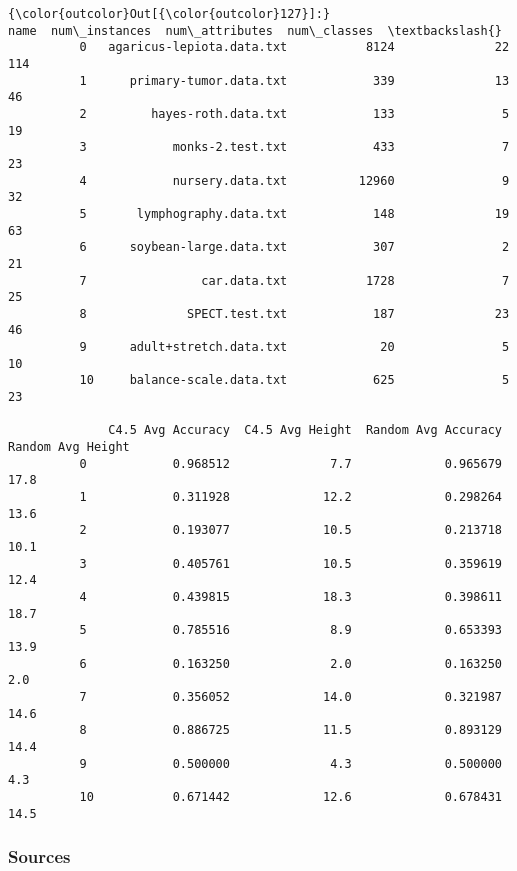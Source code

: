 \documentclass[11pt]{article}
\begin{document}
\begin{Verbatim}[commandchars=\\\{\}]
{\color{outcolor}Out[{\color{outcolor}127}]:}                          name  num\_instances  num\_attributes  num\_classes  \textbackslash{}
          0   agaricus-lepiota.data.txt           8124              22          114   
          1      primary-tumor.data.txt            339              13           46   
          2         hayes-roth.data.txt            133               5           19   
          3            monks-2.test.txt            433               7           23   
          4            nursery.data.txt          12960               9           32   
          5       lymphography.data.txt            148              19           63   
          6      soybean-large.data.txt            307               2           21   
          7                car.data.txt           1728               7           25   
          8              SPECT.test.txt            187              23           46   
          9      adult+stretch.data.txt             20               5           10   
          10     balance-scale.data.txt            625               5           23   
          
              C4.5 Avg Accuracy  C4.5 Avg Height  Random Avg Accuracy  Random Avg Height  
          0            0.968512              7.7             0.965679               17.8  
          1            0.311928             12.2             0.298264               13.6  
          2            0.193077             10.5             0.213718               10.1  
          3            0.405761             10.5             0.359619               12.4  
          4            0.439815             18.3             0.398611               18.7  
          5            0.785516              8.9             0.653393               13.9  
          6            0.163250              2.0             0.163250                2.0  
          7            0.356052             14.0             0.321987               14.6  
          8            0.886725             11.5             0.893129               14.4  
          9            0.500000              4.3             0.500000                4.3  
          10           0.671442             12.6             0.678431               14.5  
\end{Verbatim}
            
    \hypertarget{sources}{%
\subsubsection{Sources}\label{sources}}
\end{document}
